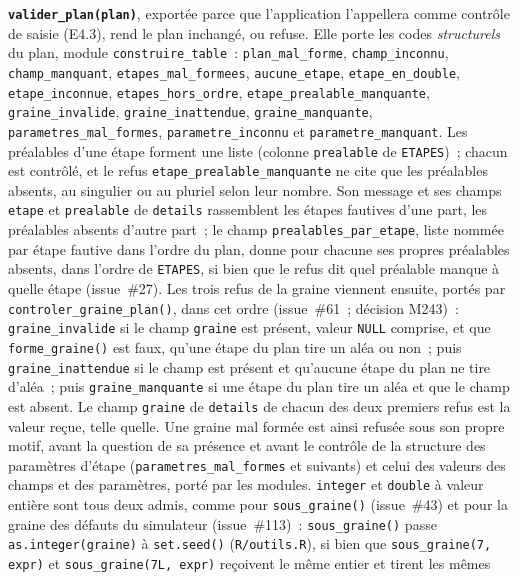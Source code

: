 \documentclass[a4paper,11pt]{article}
\newcommand{\code}[1]{\texttt{\small #1}}
\begin{document}
\medskip
{\sloppy{} \textbf{\code{valider\_plan(plan)}}, exportée parce que l'application l'appellera
comme contrôle de saisie (E4.3), rend le plan inchangé, ou refuse. Elle porte
les codes \emph{structurels} du plan, module \code{construire\_table}~:
\code{plan\_mal\_forme}, \code{champ\_inconnu}, \code{champ\_manquant},
\code{etapes\_mal\_formees}, \code{aucune\_etape}, \code{etape\_en\_double},
\code{etape\_inconnue}, \code{etapes\_hors\_ordre},
\code{etape\_prealable\_manquante}, \code{graine\_invalide},
\code{graine\_inattendue}, \code{graine\_manquante},
\code{parametres\_mal\_formes},
\code{parametre\_inconnu} et \code{parametre\_manquant}. Les préalables
d'une étape forment une liste (colonne \code{prealable} de \code{ETAPES})~;
chacun est contrôlé, et le refus \code{etape\_prealable\_manquante} ne cite
que les préalables absents, au singulier ou au pluriel selon leur nombre.
Son message et ses champs \code{etape} et \code{prealable} de
\code{details} rassemblent les étapes fautives d'une part, les préalables
absents d'autre part~; le champ \code{prealables\_par\_etape}, liste nommée
par étape fautive dans l'ordre du plan, donne pour chacune ses propres
préalables absents, dans l'ordre de \code{ETAPES}, si bien que le refus dit
quel préalable manque à quelle étape (issue~\#27).
Les trois refus de la graine viennent ensuite, portés par
\code{controler\_graine\_plan()}, dans cet ordre (issue~\#61~; décision
M243)~: \code{graine\_invalide} si le champ \code{graine} est présent,
valeur \code{NULL} comprise, et que \code{forme\_graine()} est faux, qu'une
étape du plan tire un aléa ou non~; puis \code{graine\_inattendue} si le
champ est présent et qu'aucune étape du plan ne tire d'aléa~; puis
\code{graine\_manquante} si une étape du plan tire un aléa et que le champ
est absent. Le champ \code{graine} de \code{details} de chacun des deux
premiers refus est la valeur reçue, telle quelle. Une graine mal formée est
ainsi refusée sous son propre motif, avant la question de sa présence et
avant le contrôle de la structure des paramètres d'étape
(\code{parametres\_mal\_formes} et suivants) et celui des valeurs des
champs et des paramètres, porté par les modules. \code{integer} et \code{double} à valeur
entière sont tous deux admis, comme pour \code{sous\_graine()} (issue~\#43)
et pour la graine des défauts du simulateur (issue~\#113)~:
\code{sous\_graine()} passe \code{as.integer(graine)} à \code{set.seed()}
(\code{R/outils.R}), si bien que \code{sous\_graine(7, expr)} et
\code{sous\_graine(7L, expr)} reçoivent le même entier et tirent les mêmes
}
\end{document}
